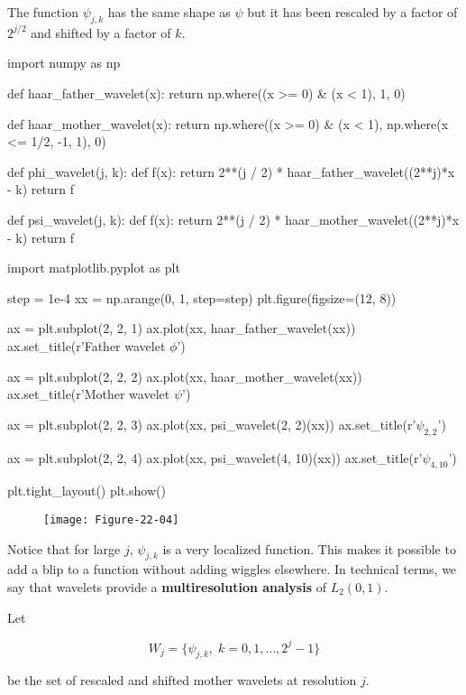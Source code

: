The function \(\psi_{j, k}\) has the same shape as \(\psi\) but it has
been rescaled by a factor of \(2^{j/2}\) and shifted by a factor of
\(k\).

\begin{python}
import numpy as np

def haar_father_wavelet(x):
    return np.where((x >= 0) & (x < 1), 1, 0)

def haar_mother_wavelet(x):
    return np.where((x >= 0) & (x < 1),  np.where(x <= 1/2, -1, 1), 0)

def phi_wavelet(j, k):
    def f(x):
        return 2**(j / 2) * haar_father_wavelet((2**j)*x - k)
    return f

def psi_wavelet(j, k):
    def f(x):
        return 2**(j / 2) * haar_mother_wavelet((2**j)*x - k)
    return f
\end{python}

\begin{python}
import matplotlib.pyplot as plt

step = 1e-4
xx = np.arange(0, 1, step=step)
plt.figure(figsize=(12, 8))

ax = plt.subplot(2, 2, 1)
ax.plot(xx, haar_father_wavelet(xx))
ax.set_title(r'Father wavelet $\phi$')
    
ax = plt.subplot(2, 2, 2)
ax.plot(xx, haar_mother_wavelet(xx))
ax.set_title(r'Mother wavelet $\psi$')

ax = plt.subplot(2, 2, 3)
ax.plot(xx, psi_wavelet(2, 2)(xx))
ax.set_title(r'$\psi_{2, 2}$')

ax = plt.subplot(2, 2, 4)
ax.plot(xx, psi_wavelet(4, 10)(xx))
ax.set_title(r'$\psi_{4, 10}$')

plt.tight_layout()
plt.show()
\end{python}

\begin{figure}[H]
\texttt{[image: Figure-22-04]}
\end{figure}

Notice that for large \(j\), \(\psi_{j, k}\) is a very localized
function. This makes it possible to add a blip to a function without
adding wiggles elsewhere. In technical terms, we say that wavelets
provide a \textbf{multiresolution analysis} of \(L_2(0, 1)\).

Let

\[ W_j = \{\psi_{j, k}, \; k = 0, 1, \dots, 2^j - 1\} \]

be the set of rescaled and shifted mother wavelets at resolution \(j\).

